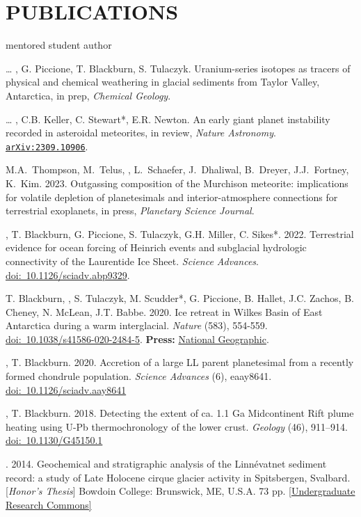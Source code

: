 \section*{PUBLICATIONS}
\hfill* mentored student author
\newcommand{\inprep}[1]{in prep, \textit{#1}}
\newcommand{\submitted}[1]{submitted, \textit{#1}}
\newcommand{\inreview}[1]{in review, \textit{#1}}
\newcommand{\inpress}[1]{in press, \textit{#1}}
\newcommand{\doi}[1]{\href{https://doi.org/#1}{doi:~#1}}
\newcommand{\arxiv}[1]{\href{https://arxiv.org/abs/#1}{\texttt{arXiv:#1}}}

\begin{etaremune} [itemsep=4pt, leftmargin=3ex]
\item[\dots] \ghedwards, G. Piccione, T. Blackburn,  S. Tulaczyk. Uranium-series isotopes as tracers of physical and chemical weathering in glacial sediments from Taylor Valley, Antarctica, \inprep{Chemical Geology}.
\item[\dots] \ghedwards, C.B. Keller, C. Stewart*, E.R. Newton. An early giant planet instability recorded in asteroidal meteorites, \inreview{Nature Astronomy}. \arxiv{2309.10906}.
\item M.A.~Thompson, M.~Telus, \ghedwards, L.~Schaefer, J.~Dhaliwal, B.~Dreyer, J.J.~Fortney, K.~Kim. 2023. Outgassing composition of the Murchison meteorite: implications for volatile depletion of planetesimals and interior-atmosphere connections for terrestrial exoplanets, \inpress{Planetary Science Journal}. 
\item \ghedwards, T. Blackburn, G. Piccione, S. Tulaczyk, G.H. Miller, C. Sikes*. 2022. Terrestrial evidence for ocean forcing of Heinrich events and subglacial hydrologic connectivity of the Laurentide Ice Sheet. \textit{Science Advances}. \doi{10.1126/sciadv.abp9329}.
\item T. Blackburn, \ghedwards, S. Tulaczyk, M. Scudder*, G. Piccione, B. Hallet, J.C. Zachos, B. Cheney, N. McLean, J.T. Babbe. 2020. Ice retreat in Wilkes Basin of East Antarctica during a warm interglacial. \textit{Nature} (583), 554-559. \doi{10.1038/s41586-020-2484-5}. \textbf{Press:} \href{https://www.nationalgeographic.com/science/2020/07/east-antarctic-ice-sheet-more-vulnerable-to-melting-than-thought/}{National Geographic}.
\item \ghedwards, T. Blackburn. 2020. Accretion of a large LL parent planetesimal from a recently formed chondrule population. \textit{Science Advances} (6), eaay8641. \doi{10.1126/sciadv.aay8641}
\item \ghedwards, T. Blackburn. 2018. Detecting the extent of ca. 1.1 Ga Midcontinent Rift plume heating using U-Pb thermochronology of the lower crust. \textit{Geology} (46), 911–914. \doi{10.1130/G45150.1} 
\item \ghedwards. 2014. Geochemical and stratigraphic analysis of the Linnévatnet sediment record: a study of Late Holocene cirque glacier activity in Spitsbergen, Svalbard. [\textit{Honor’s Thesis}] Bowdoin College: Brunswick, ME, U.S.A. 73 pp. \href{https://digitalcommons.bowdoin.edu/honorsprojects/12/}{[Undergraduate Research Commons]}
\end{etaremune}